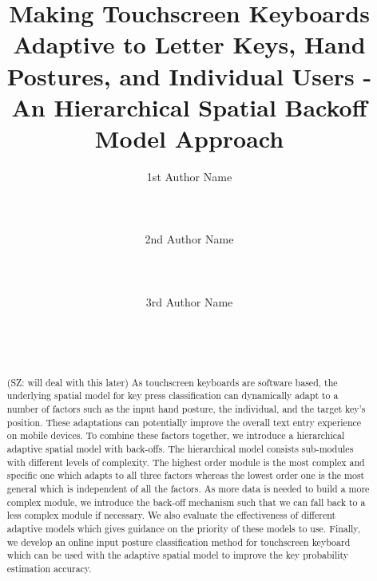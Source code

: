 \documentclass{sigchi}
\begin{document}
\title{Making Touchscreen Keyboards Adaptive to Letter Keys, Hand Postures,  and Individual Users - An Hierarchical Spatial Backoff Model Approach}

\author{
  \alignauthor 1st Author Name\\
    \\
    \\
    \\
  \alignauthor 2nd Author Name\\
    \\
    \\
    \\
  \alignauthor 3rd Author Name\\
    \\
    \\
    \\
}


\maketitle

\begin{abstract}
(SZ: will deal with this later) As touchscreen keyboards are software based, the underlying spatial model for key press
classification can dynamically adapt to a number of factors such as the input 
hand posture, the individual, and the target key's position. These adaptations can
potentially improve the overall text entry experience on mobile devices. To 
combine these factors together, we introduce a hierarchical adaptive spatial 
model with back-offs. The hierarchical model consists sub-modules with different levels of
complexity. The highest order module is the most complex and specific one which adapts to 
all three factors whereas the lowest order one is the most general which is independent
of all the factors. As more data is needed to build a more complex module, we introduce
the back-off mechanism such that we can fall back to a less complex module if necessary.
We also evaluate the effectiveness of different adaptive models which gives 
guidance on the priority of these models to use. Finally, we
develop an online input posture classification method for touchscreen keyboard which can be
used with the adaptive spatial model to improve the key probability estimation accuracy.
 
\end{abstract}
\end{document}
